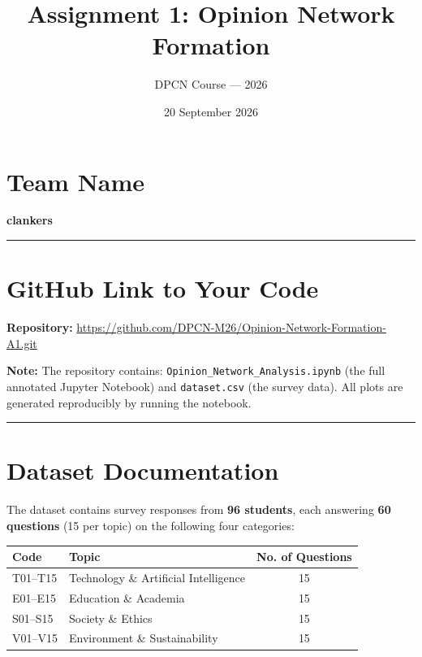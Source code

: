 \documentclass[11pt]{article}
\title{\textbf{Assignment 1: Opinion Network Formation}}
\author{DPCN Course — 2026}
\date{20 September 2026}
\begin{document}
\maketitle

\section*{Team Name}
\textbf{clankers}
\vspace{0.5cm}\hrule\vspace{0.5cm}

\section*{GitHub Link to Your Code}
\textbf{Repository:} \href{https://github.com/DPCN-M26/Opinion-Network-Formation-A1.git}{https://github.com/DPCN-M26/Opinion-Network-Formation-A1.git}

\begin{mdframed}[backgroundcolor=black!5, linecolor=black!10]
\textbf{Note:} The repository contains: \texttt{Opinion\_Network\_Analysis.ipynb} (the full annotated Jupyter Notebook) and \texttt{dataset.csv} (the survey data). All plots are generated reproducibly by running the notebook.
\end{mdframed}
\vspace{0.5cm}\hrule\vspace{0.5cm}

\section{Dataset Documentation}
The dataset contains survey responses from \textbf{96 students}, each answering \textbf{60 questions} (15 per topic) on the following four categories:

\begin{center}
\begin{tabular}{@{}llc@{}}
\toprule
\textbf{Code} & \textbf{Topic} & \textbf{No. of Questions} \\ \midrule
T01--T15 & Technology \& Artificial Intelligence & 15 \\
E01--E15 & Education \& Academia & 15 \\
S01--S15 & Society \& Ethics & 15 \\
V01--V15 & Environment \& Sustainability & 15 \\ \bottomrule
\end{tabular}
\end{center}
\end{document}
